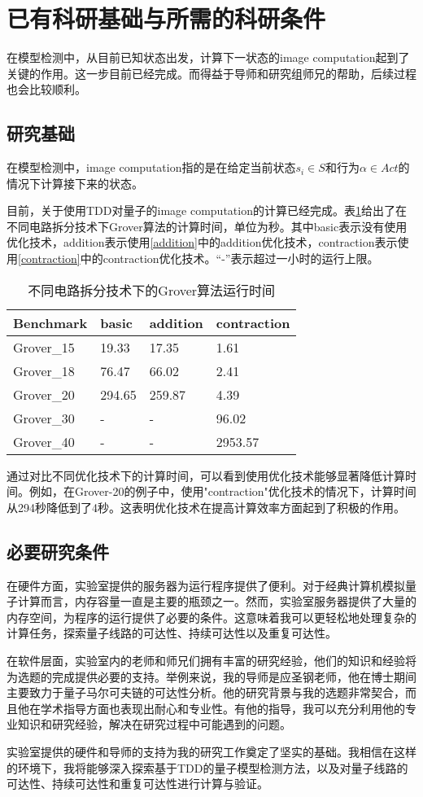 \section{已有科研基础与所需的科研条件}
在模型检测中，从目前已知状态出发，计算下一状态的image computation起到了关键的作用。这一步目前已经完成。而得益于导师和研究组师兄的帮助，后续过程也会比较顺利。
\subsection{研究基础}
在模型检测中，image computation指的是在给定当前状态$s_i\in S$和行为$\alpha\in Act$的情况下计算接下来的状态。

目前，关于使用TDD对量子的image computation的计算已经完成。表\ref{table:time}给出了在不同电路拆分技术下Grover算法的计算时间，单位为秒。其中basic表示没有使用优化技术，addition表示使用\ref{addition}中的addition优化技术，contraction表示使用\ref{contraction}中的contraction优化技术。“-”表示超过一小时的运行上限。
\begin{table}[!htbp]
    \centering
    \begin{tabular}{@{}llll@{}}
        \toprule
        Benchmark  & basic  & addition & contraction \\ \midrule
        Grover\_15 & 19.33  & 17.35    & 1.61        \\
        Grover\_18 & 76.47  & 66.02    & 2.41        \\
        Grover\_20 & 294.65 & 259.87   & 4.39        \\
        Grover\_30 & -      & -        & 96.02       \\
        Grover\_40 & -      & -        & 2953.57     \\ \bottomrule
    \end{tabular}
    \caption{不同电路拆分技术下的Grover算法运行时间}
    \label{table:time}
\end{table}

通过对比不同优化技术下的计算时间，可以看到使用优化技术能够显著降低计算时间。例如，在Grover-20的例子中，使用"contraction"优化技术的情况下，计算时间从294秒降低到了4秒。这表明优化技术在提高计算效率方面起到了积极的作用。

\subsection{必要研究条件}
在硬件方面，实验室提供的服务器为运行程序提供了便利。对于经典计算机模拟量子计算而言，内存容量一直是主要的瓶颈之一。然而，实验室服务器提供了大量的内存空间，为程序的运行提供了必要的条件。这意味着我可以更轻松地处理复杂的计算任务，探索量子线路的可达性、持续可达性以及重复可达性。

在软件层面，实验室内的老师和师兄们拥有丰富的研究经验，他们的知识和经验将为选题的完成提供必要的支持。举例来说，我的导师是应圣钢老师，他在博士期间主要致力于量子马尔可夫链的可达性分析。他的研究背景与我的选题非常契合，而且他在学术指导方面也表现出耐心和专业性。有他的指导，我可以充分利用他的专业知识和研究经验，解决在研究过程中可能遇到的问题。

实验室提供的硬件和导师的支持为我的研究工作奠定了坚实的基础。我相信在这样的环境下，我将能够深入探索基于TDD的量子模型检测方法，以及对量子线路的可达性、持续可达性和重复可达性进行计算与验证。

